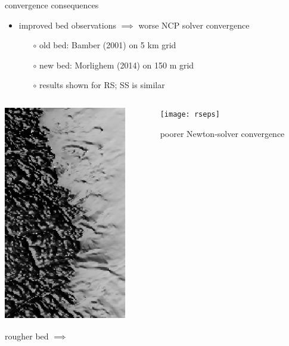 \documentclass[xcolor={dvipsnames}]{beamer}
\begin{document}
\begin{frame}{convergence consequences}

\begin{itemize}
\item improved bed observations $\implies$ worse NCP solver convergence
  \begin{itemize}
  \item[$\circ$] old bed: Bamber (2001) on 5 km grid
  \item[$\circ$] new bed: Morlighem (2014) on 150 m grid
  \item[$\circ$] results shown for RS; SS is similar
  \end{itemize}
\end{itemize}

\begin{columns}
\begin{column}{0.4\textwidth}
\includegraphics[height=0.5\textheight,keepaspectratio=true]{insetinset}

rougher bed \hfill $\implies$ \phantom{sddf}
\end{column}
\begin{column}{0.6\textwidth}
\texttt{[image: rseps]}

poorer Newton-solver convergence
\end{column}
\end{columns}
\end{frame}
\end{document}
